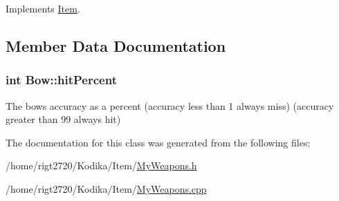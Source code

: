 Implements \hyperlink{classItem_abd3f52dd7fa25d497f2070e95d44ac03}{Item}.



\subsection{Member Data Documentation}
\hypertarget{classBow_ab6156932e51ec7833d07a669e5e346ff}{
\subsubsection[{hit\-Percent}]{\setlength{\rightskip}{0pt plus 5cm}int Bow\-::hit\-Percent\hspace{0.3cm}{\ttfamily [protected]}}}\label{classBow_ab6156932e51ec7833d07a669e5e346ff}
The bows accuracy as a percent (accuracy less than 1 always miss) (accuracy greater than 99 always hit) 

The documentation for this class was generated from the following files\-:\begin{DoxyCompactItemize}
\item 
/home/rigt2720/\-Kodika/\-Item/\hyperlink{MyWeapons_8h}{My\-Weapons.\-h}\item 
/home/rigt2720/\-Kodika/\-Item/\hyperlink{MyWeapons_8cpp}{My\-Weapons.\-cpp}\end{DoxyCompactItemize}
